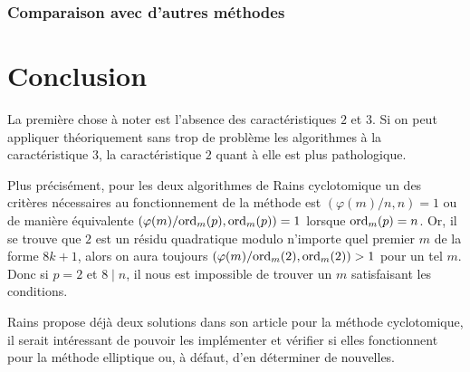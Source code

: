 \documentclass[a4paper]{article} %
\numberwithin{section}{part}
\numberwithin{equation}{section}
\newcommand\ord[2]{\textup{ord}_{#1}(#2)}
\begin{document}
\section{Comparaison avec d'autres méthodes}
%
%
%


\part{Conclusion}
\label{quatre}
La première chose à noter est l'absence des caractéristiques $2$ et $3$. Si on
peut appliquer théoriquement sans trop de problème les algorithmes à la
caractéristique $3$, la caractéristique $2$ quant à elle est plus
pathologique.\par
Plus précisément, pour les deux algorithmes de Rains cyclotomique un des 
critères nécessaires au fonctionnement de la méthode est $(\varphi(m)/n, n) = 1$
ou de manière équivalente $(\varphi(m)/\ord{m}{p},\ord{m}{p}) = 1$
lorsque $\ord{m}{p} = n$. Or, il se trouve que $2$ est un résidu
quadratique modulo n'importe quel premier $m$ de la forme $8k + 1$, alors on
aura toujours $(\varphi(m)/\ord{m}{2},\ord{m}{2}) > 1$ pour un tel
$m$. Donc si $p = 2$ et $8\mid n$, il nous est impossible de trouver un $m$
satisfaisant les conditions.\par
Rains propose déjà deux solutions dans son article pour la méthode cyclotomique,
il serait intéressant de pouvoir les implémenter et vérifier si elles
fonctionnent pour la méthode elliptique ou, à défaut, d'en déterminer de
nouvelles.

\vspace{0.3cm}
\end{document}
